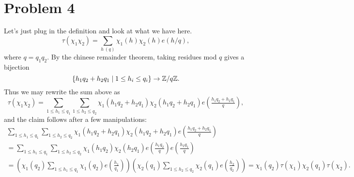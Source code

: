 \documentclass[a4paper,11pt]{article}
\begin{document}
\section*{Problem 4}
Let's just plug in the definition and look at what we have here.
\[
    \tau(\chi_1 \chi_2) = \sum_{h \ (q)} \chi_1(h) \chi_2(h) e(h/q),
\]
where $q = q_1 q_2$. By the chinese remainder theorem, taking residues mod $q$ gives
a bijection
\[
    \{h_1 q_2 + h_2 q_1 \mid 1 \leq h_i \leq q_i\} \to \mathbb{Z}/q\mathbb{Z}.
\]
Thus we may rewrite the sum above as 
\[
    \tau(\chi_1 \chi_2) = \sum_{1 \leq h_1 \leq q_1} \sum_{1 \leq h_2 \leq q_2}\chi_1(h_1q_2 + h_2q_1) \chi_2(h_1q_2 + h_2 q_1) e(\tfrac{h_1q_2+h_2q_1}q),
\]
and the claim follows after a few manipulations:
\begin{multline*}
     \sum_{1 \leq h_1 \leq q_1} \sum_{1 \leq h_2 \leq q_2}\chi_1(h_1q_2 + h_2q_1) \chi_2(h_1q_2
     + h_2 q_1) e(\tfrac{h_1q_2+h_2q_1}q) \\
     = \sum_{1 \leq h_1 \leq q_1} \sum_{1 \leq h_2 \leq q_2}\chi_1(h_1q_2) \chi_2(h_2 q_1)
     e(\tfrac{h_1q_2}q) e(\tfrac{h_2q_1}q) \\ 
     = \left(\chi_1(q_2)\sum_{1 \leq h_1 \leq q_1}
     \chi_1(q_2)e(\tfrac{h_1}{q_1})\right) \left(\chi_2(q_1)\sum_{1 \leq h_2 \leq q_2}
     \chi_2(q_1)e(\tfrac{h_2}{q_2})\right) = \chi_1(q_2)\tau(\chi_1) \chi_2(q_1)\tau(\chi_2).
\end{multline*}
\end{document}
